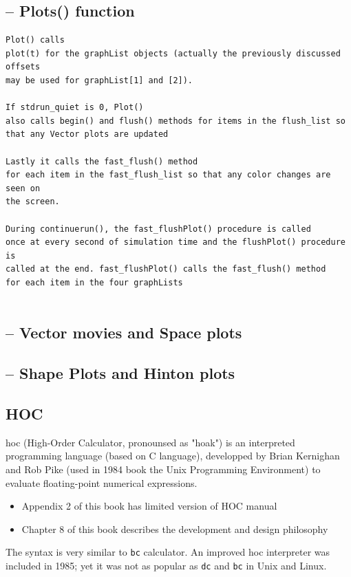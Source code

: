 \subsection{-- Plots() function}
\label{sec:NEUROn-Plots()}	

\begin{verbatim}
Plot() calls
plot(t) for the graphList objects (actually the previously discussed offsets
may be used for graphList[1] and [2]).

If stdrun_quiet is 0, Plot()
also calls begin() and flush() methods for items in the flush_list so
that any Vector plots are updated

Lastly it calls the fast_flush() method
for each item in the fast_flush_list so that any color changes are seen on
the screen.

During continuerun(), the fast_flushPlot() procedure is called
once at every second of simulation time and the flushPlot() procedure is
called at the end. fast_flushPlot() calls the fast_flush() method
for each item in the four graphLists


\end{verbatim}

\subsection{-- Vector movies and Space plots}

\subsection{-- Shape Plots and Hinton plots}

\subsection{HOC}
\label{sec:hoc}

hoc (High-Order Calculator, pronounsed as "hoak") is an interpreted programming
language (based on C language), developped by Brian Kernighan and Rob Pike (used
in 1984 book the Unix Programming Environment) to evaluate floating-point numerical expressions.
\begin{itemize}
  \item  Appendix 2 of this book has limited version of HOC manual
  \item Chapter 8 of this book describes the development and design philosophy
\end{itemize}
The syntax is very similar to \verb!bc! calculator.
An improved hoc interpreter was included in 1985; yet it was not as popular as
\verb!dc! and \verb!bc! in Unix and Linux. 

